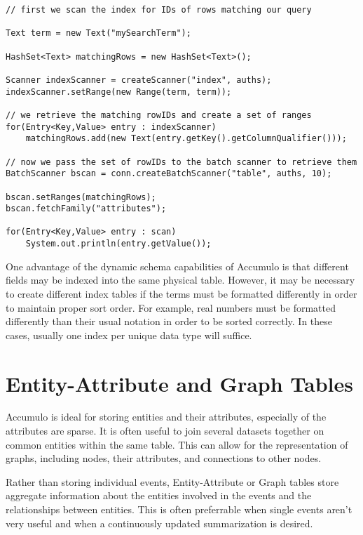 \small
\begin{verbatim}
// first we scan the index for IDs of rows matching our query

Text term = new Text("mySearchTerm");

HashSet<Text> matchingRows = new HashSet<Text>();

Scanner indexScanner = createScanner("index", auths);
indexScanner.setRange(new Range(term, term));

// we retrieve the matching rowIDs and create a set of ranges
for(Entry<Key,Value> entry : indexScanner)
    matchingRows.add(new Text(entry.getKey().getColumnQualifier()));

// now we pass the set of rowIDs to the batch scanner to retrieve them
BatchScanner bscan = conn.createBatchScanner("table", auths, 10);

bscan.setRanges(matchingRows);
bscan.fetchFamily("attributes");

for(Entry<Key,Value> entry : scan)
    System.out.println(entry.getValue());
\end{verbatim}
\normalsize

One advantage of the dynamic schema capabilities of Accumulo is that different
fields may be indexed into the same physical table. However, it may be necessary to
create different index tables if the terms must be formatted differently in order to
maintain proper sort order. For example, real numbers must be formatted
differently than their usual notation in order to be sorted correctly. In these cases,
usually one index per unique data type will suffice.

\section{Entity-Attribute and Graph Tables}

Accumulo is ideal for storing entities and their attributes, especially of the
attributes are sparse. It is often useful to join several datasets together on common
entities within the same table. This can allow for the representation of graphs,
including nodes, their attributes, and connections to other nodes.

Rather than storing individual events, Entity-Attribute or Graph tables store
aggregate information about the entities involved in the events and the
relationships between entities. This is often preferrable when single events aren't
very useful and when a continuously updated summarization is desired.

